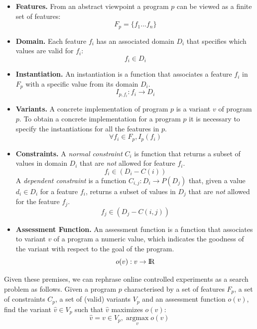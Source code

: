 \documentclass{report}
\DeclareMathOperator*{\argmax}{argmax}
\begin{document}
\begin{itemize}
	\item \textbf{Features.} From an abstract viewpoint a program $p$ can be viewed as a finite set of features: 
	      $$F_p = \{f_1...f_n\}$$
	\item \textbf{Domain.} Each feature $f_i$ has an associated domain $D_i$ that specifies which values are valid for $f_i$:
	      $$f_i \in D_i$$
	\item \textbf{Instantiation.}  An instantiation is a function  that associates a feature $f_i$ in $F_p$ with a specific value from its domain $D_i$.
	      $$I_{p,f_i} : f_i \rightarrow D_i$$
	      
	\item \textbf{Variants.} A concrete implementation of program $p$ is a variant $v$ of program $p$. To obtain a concrete implementation for a program $p$ it is necessary to specify the instantiations for all the features in $p$.
	      $$\forall f_i \in F_p, I_p(f_i)$$
	      
	\item \textbf{Constraints.} A \emph{normal constraint} $C_i$ is function that returns a subset of values in domain $D_i$ that are \emph{not} allowed for feature $f_i$.
	      $$ f_i \in (D_i - C(i))$$
	      A \emph{dependent constraint} is a function $C_{i,j} : D_i \rightarrow P(D_j)$ that, given a value $d_i \in D_i$ for a feature $f_i$, returns a subset of values in $D_j$ that are \emph{not} allowed for the feature $f_j$.
	      $$ f_j \in (D_j - C(i,j))$$
	\item \textbf{Assessment Function.} An assessment function is a function that associates to variant $v$ of a program a numeric value, which indicates the goodness of the variant with respect to the goal of the program. 
	      $$o(v) : v \rightarrow {\rm I\!R}$$ 
\end{itemize}

Given these premises, we can rephrase online controlled experiments as a search problem as follows.
Given a program $p$ characterised by a set of features $F_p$, a set of constraints
$C_p$, a set of (valid) variants $V_p$ and an assessment function $o(v)$, find the variant $\hat{v} \in V_p$ such that $\hat{v}$ maximizes $o(v)$:
$$\hat{v} = v \in V_p, \argmax\limits_v o(v)$$\\

\FloatBarrier
\end{document}
